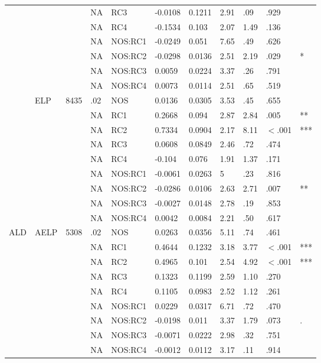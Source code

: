 \begin{table}[ht]
\begin{tabular}{lllllllllll}
   &  &  & NA & RC3 & -0.0108 & 0.1211 & 2.91 & .09 & .929 &   \\ 
   &  &  & NA & RC4 & -0.1534 & 0.103 & 2.07 & 1.49 & .136 &   \\ 
   &  &  & NA & NOS:RC1 & -0.0249 & 0.051 & 7.65 & .49 & .626 &   \\ 
   &  &  & NA & NOS:RC2 & -0.0298 & 0.0136 & 2.51 & 2.19 & .029 & * \\ 
   &  &  & NA & NOS:RC3 & 0.0059 & 0.0224 & 3.37 & .26 & .791 &   \\ 
   &  &  & NA & NOS:RC4 & 0.0073 & 0.0114 & 2.51 & .65 & .519 &   \\ 
   & ELP & 8435 & .02 & NOS & 0.0136 & 0.0305 & 3.53 & .45 & .655 &   \\ 
   &  &  & NA & RC1 & 0.2668 & 0.094 & 2.87 & 2.84 & .005 & ** \\ 
   &  &  & NA & RC2 & 0.7334 & 0.0904 & 2.17 & 8.11 & $<$.001 & *** \\ 
   &  &  & NA & RC3 & 0.0608 & 0.0849 & 2.46 & .72 & .474 &   \\ 
   &  &  & NA & RC4 & -0.104 & 0.076 & 1.91 & 1.37 & .171 &   \\ 
   &  &  & NA & NOS:RC1 & -0.0061 & 0.0263 & 5 & .23 & .816 &   \\ 
   &  &  & NA & NOS:RC2 & -0.0286 & 0.0106 & 2.63 & 2.71 & .007 & ** \\ 
   &  &  & NA & NOS:RC3 & -0.0027 & 0.0148 & 2.78 & .19 & .853 &   \\ 
   &  &  & NA & NOS:RC4 & 0.0042 & 0.0084 & 2.21 & .50 & .617 &   \\ 
  ALD & AELP & 5308 & .02 & NOS & 0.0263 & 0.0356 & 5.11 & .74 & .461 &   \\ 
   &  &  & NA & RC1 & 0.4644 & 0.1232 & 3.18 & 3.77 & $<$.001 & *** \\ 
   &  &  & NA & RC2 & 0.4965 & 0.101 & 2.54 & 4.92 & $<$.001 & *** \\ 
   &  &  & NA & RC3 & 0.1323 & 0.1199 & 2.59 & 1.10 & .270 &   \\ 
   &  &  & NA & RC4 & 0.1105 & 0.0983 & 2.52 & 1.12 & .261 &   \\ 
   &  &  & NA & NOS:RC1 & 0.0229 & 0.0317 & 6.71 & .72 & .470 &   \\ 
   &  &  & NA & NOS:RC2 & -0.0198 & 0.011 & 3.37 & 1.79 & .073 & . \\ 
   &  &  & NA & NOS:RC3 & -0.0071 & 0.0222 & 2.98 & .32 & .751 &   \\ 
   &  &  & NA & NOS:RC4 & -0.0012 & 0.0112 & 3.17 & .11 & .914 &   \\ 

\end{tabular}
\end{table}
